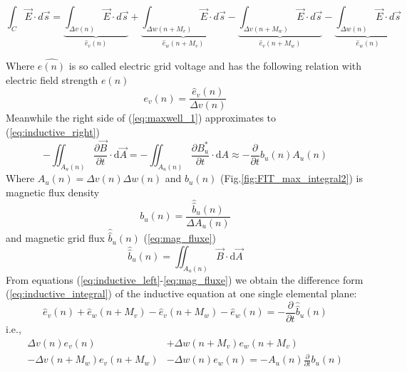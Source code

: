 \begin{equation}
\int_{C}\vec{E}\cdot d\vec{s}
=\underbrace{\int_{\Delta v(n)}\vec{E}\cdot d\vec{s}}_{\widehat{e}_{v}(n)}
+\underbrace{\int_{\Delta w(n+M_{v})}\vec{E}\cdot d\vec{s}}_{\widehat{e}_{w}(n+M_{v})}
-\underbrace{\int_{\Delta v(n+M_{w})}\vec{E}\cdot d\vec{s}}_{\widehat{e}_{v}(n+M_{w})}
-\underbrace{\int_{\Delta w(n)}\vec{E}\cdot d\vec{s}}_{\widehat{e}_{w}(n)}
\label{eq:inductive_left}
\end{equation}

Where $\widehat{e(n)}$ is so called  electric grid voltage and has the following relation with electric field strength $e(n)$
\begin{equation}
 e_{v}(n)=\frac{\widehat{e}_{v}(n)}{\Delta v(n)}
\label{eq:e_field}
\end{equation}
Meanwhile the right side of (\ref{eq:maxwell_1}) approximates to (\ref{eq:inductive_right})
\begin{equation}
-\iint_{A_{u}(n)}\frac{\partial\vec{B}}{\partial t}\cdot\mathrm{d}\vec{A} 
=-\iint_{A_{u}(n)}\frac{\partial B^{*}_{u}}{\partial t}\cdot\mathrm{d}A
\approx -\frac{\partial}{\partial t}b_{u}(n)A_{u}(n)
\label{eq:inductive_right}
\end{equation}
Where $A_{u}(n)=\Delta v(n)\Delta w(n)$ and $b_{u}(n)$ (Fig.\ref{fig:FIT_max_integral2}) is magnetic flux density
\begin{equation}
 b_{u}(n)=\frac{\widehat{\widehat{b}}_{u}(n)}{\Delta A_{u}(n)}
\label{eq:b_flux_density}
\end{equation}
 and magnetic grid flux $\widehat{\widehat{b}}_{u}(n)$ (\ref{eq:mag_fluxe})
\begin{equation}
\widehat{\widehat{b}}_{u}(n)=\iint_{A_{u}(n)}\vec{B}\cdot\mathrm{d}\vec{A}
\label{eq:mag_fluxe}
\end{equation}
From equations (\ref{eq:inductive_left}-\ref{eq:mag_fluxe}) we obtain the difference form (\ref{eq:inductive_integral}) of the inductive equation at one single elemental plane:
\begin{equation}
\widehat{e}_{v}(n)+\widehat{e}_{w}(n+M_{v})-\widehat{e}_{v}(n+M_{w})-\widehat{e}_{w}(n)=-\frac{\partial}{\partial t}\widehat{\widehat{b}}_{u}(n)
\label{eq:inductive_integral}
\end{equation}
i.e.,
\begin{align}
\Delta v(n)e_{v}(n)&+\Delta w(n+M_{v})e_{w}(n+M_{v})\nonumber\\
-\Delta v(n+M_{w})e_{v}(n+M_{w})&-\Delta w(n)e_{w}(n)=-A_{u}(n)\frac{\partial}{\partial{t}}b_{u}(n) 
\label{eq:inductive_sample}
\end{align}
